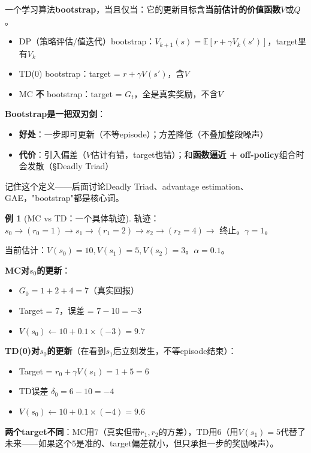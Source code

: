 \documentclass[11pt,a4paper]{article}
\theoremstyle{definition}
\newtheorem{example}{例}[section]
\begin{document}
\begin{keypoint}[Bootstrapping的正式定义]
一个学习算法\textbf{bootstrap}，当且仅当：它的更新目标含\textbf{当前估计的价值函数}$V$或$Q$。

\begin{itemize}
\item DP（策略评估/值迭代）bootstrap：$V_{k+1}(s) = \mathbb{E}[r + \gamma V_k(s')]$，target里有$V_k$
\item TD(0) bootstrap：target = $r + \gamma V(s')$，含$V$
\item MC \textbf{不} bootstrap：target = $G_t$，全是真实奖励，不含$V$
\end{itemize}

\textbf{Bootstrap是一把双刃剑}：
\begin{itemize}
\item \textbf{好处}：一步即可更新（不等episode）；方差降低（不叠加整段噪声）
\item \textbf{代价}：引入偏差（$V$估计有错，target也错）；和\textbf{函数逼近 + off-policy}组合时会发散（§Deadly Triad）
\end{itemize}

记住这个定义——后面讨论Deadly Triad、advantage estimation、GAE，"bootstrap"都是核心词。
\end{keypoint}

\begin{example}[MC vs TD：一个具体轨迹]
轨迹：$s_0 \to (r_0=1) \to s_1 \to (r_1=2) \to s_2 \to (r_2=4) \to$ 终止。$\gamma=1$。

当前估计：$V(s_0)=10, V(s_1)=5, V(s_2)=3$。$\alpha=0.1$。

\textbf{MC对$s_0$的更新}：
\begin{itemize}
\item $G_0 = 1+2+4 = 7$（真实回报）
\item Target = 7，误差 = $7-10 = -3$
\item $V(s_0) \leftarrow 10 + 0.1\times(-3) = 9.7$
\end{itemize}

\textbf{TD(0)对$s_0$的更新}（在看到$s_1$后立刻发生，不等episode结束）：
\begin{itemize}
\item Target = $r_0 + \gamma V(s_1) = 1 + 5 = 6$
\item TD误差 $\delta_0 = 6 - 10 = -4$
\item $V(s_0) \leftarrow 10 + 0.1\times(-4) = 9.6$
\end{itemize}

\textbf{两个target不同}：MC用$7$（真实但带$r_1, r_2$的方差），TD用$6$（用$V(s_1)=5$代替了未来——如果这个$5$是准的、target偏差就小，但只承担一步的奖励噪声）。
\end{example}
\end{document}

